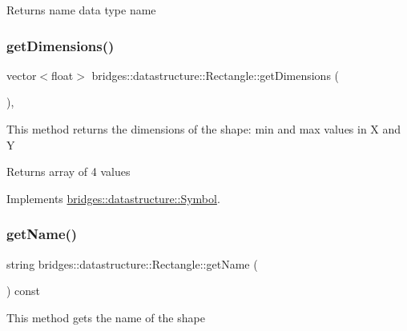 \begin{DoxyReturn}{Returns}
name data type name 
\end{DoxyReturn}
\mbox{\label{classbridges_1_1datastructure_1_1_rectangle_a2afae03e3ddd9bebaed1e573e04bdbf3}} 
\subsubsection{\texorpdfstring{getDimensions()}{getDimensions()}}
{\footnotesize\ttfamily vector$<$float$>$ bridges\+::datastructure\+::\+Rectangle\+::get\+Dimensions (\begin{DoxyParamCaption}{ }\end{DoxyParamCaption})\hspace{0.3cm}{\ttfamily [inline]}, {\ttfamily [virtual]}}

This method returns the dimensions of the shape\+: min and max values in X and Y

\begin{DoxyReturn}{Returns}
array of 4 values 
\end{DoxyReturn}


Implements \mbox{\hyperlink{classbridges_1_1datastructure_1_1_symbol_a37ba60b6acdd0888677eb8c64a931679}{bridges\+::datastructure\+::\+Symbol}}.

\mbox{\label{classbridges_1_1datastructure_1_1_rectangle_aee4fa283fa95e8c3b9f8efd5b19427b8}} 
\subsubsection{\texorpdfstring{getName()}{getName()}}
{\footnotesize\ttfamily string bridges\+::datastructure\+::\+Rectangle\+::get\+Name (\begin{DoxyParamCaption}{ }\end{DoxyParamCaption}) const\hspace{0.3cm}{\ttfamily [inline]}}

This method gets the name of the shape

